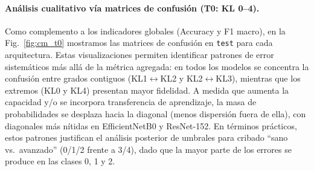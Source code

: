 \documentclass[11pt,spanish,listoffigures,listoftables]{tfgetsinf}
\begin{document}
\paragraph{Análisis cualitativo vía matrices de confusión (T0: KL 0--4).}
Como complemento a los indicadores globales (Accuracy y F1 macro), en la Fig.~\ref{fig:cm_t0} mostramos las matrices de confusión en \texttt{test} para cada arquitectura. Estas visualizaciones permiten identificar patrones de error sistemáticos más allá de la métrica agregada: en todos los modelos se concentra la confusión entre grados contiguos (KL1$\leftrightarrow$KL2 y KL2$\leftrightarrow$KL3), mientras que los extremos (KL0 y KL4) presentan mayor fidelidad. A medida que aumenta la capacidad y/o se incorpora transferencia de aprendizaje, la masa de probabilidades se desplaza hacia la diagonal (menos dispersión fuera de ella), con diagonales más nítidas en EfficientNetB0 y ResNet-152. En términos prácticos, estos patrones justifican el análisis posterior de umbrales para cribado “sano vs.\ avanzado” (0/1/2 frente a 3/4), dado que la mayor parte de los errores se produce en las clases 0, 1 y 2.
\end{document}
